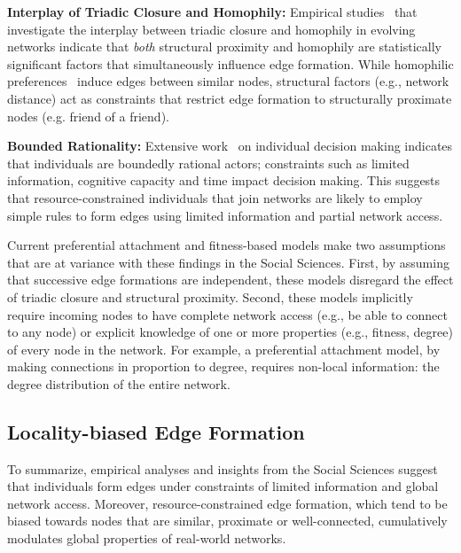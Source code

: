 \textbf{Interplay of Triadic Closure and Homophily:}
Empirical studies~\cite{35626,block2014multidimensional} that investigate the
interplay between triadic closure and homophily in evolving networks indicate
that \textit{both} structural proximity and homophily are statistically
significant factors that simultaneously influence edge formation. While
homophilic preferences~\cite{mcpherson2001birds} induce edges between similar
nodes, structural factors (e.g., network distance) act as constraints that
restrict edge formation to structurally proximate nodes (e.g. friend of a
friend).

\textbf{Bounded Rationality:}
Extensive work~\cite{simon1972theories,gigerenzer1996reasoning,lipman1995information} on
individual decision making indicates that individuals are boundedly rational
actors; constraints such as limited information, cognitive capacity and time impact decision making.
This suggests that resource-constrained individuals that join networks are likely to employ simple rules
to form edges using limited information and partial network access.

Current preferential attachment and fitness-based models
\cite{dorogovtsev2000structure,kim2017effect,singh2017relay,barabasi1999emergence}
make two assumptions that are at variance with these findings in the Social
Sciences. First, by assuming that successive edge formations are independent,
these models disregard the effect of triadic closure and structural proximity.
Second, these models implicitly require incoming nodes to have complete network
access (e.g., be able to connect to any node) or explicit knowledge of one or
more properties (e.g., fitness, degree) of every node in the network. For
example, a preferential attachment model, by making connections in proportion to
degree, requires non-local information: the degree distribution of the entire
network.

\subsection{Locality-biased Edge Formation}


To summarize, empirical analyses and insights from the Social Sciences suggest that individuals form
edges under constraints of limited information and global network access.
Moreover, resource-constrained edge formation, which tend to be biased towards
nodes that are similar, proximate or well-connected, cumulatively modulates global
properties of real-world networks.


